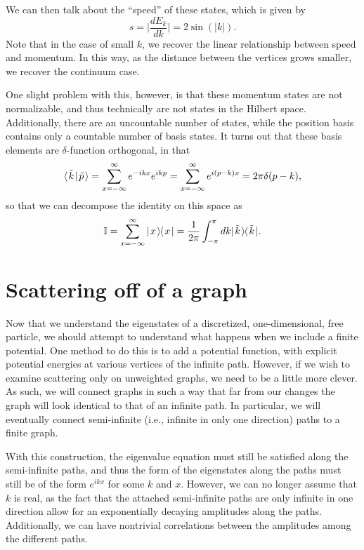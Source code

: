 \documentclass[../thesis-main/thesis-main]{subfiles}
\begin{document}
  We can then talk about the ``speed'' of these states, which is given by
\begin{equation}
  s = \Big| \frac{d E_k}{d k} \Big| = 2 \sin (|k|).
\end{equation}
Note that in the case of small $k$, we recover the linear relationship between speed and momentum.  In this way, as the distance between the vertices grows smaller, we recover the continuum case.  

One slight problem with this, however, is that these momentum states are not normalizable, and thus technically are not states in the Hilbert space.  Additionally, there are an uncountable number of states, while the position basis contains only a countable number of basis states.  It turns out that these basis elements are $\delta$-function orthogonal, in that
\begin{equation}
  \langle\mspace{2mu} \tilde{k} \mspace{2mu} | \mspace{2mu} \tilde{p}\mspace{2mu} \rangle = \sum_{x=-\infty}^\infty e^{- i k x} e^{i k p} = \sum_{x=-\infty}^\infty e^{i (p-k) x} = 2\pi \delta(p-k),
\end{equation}
so that we can decompose the identity on this space as 
\begin{equation}
\mathbb{I} = \sum_{x=-\infty}^\infty |\mspace{2mu} x \mspace{2mu} \rangle\mspace{-2mu}\langle\mspace{2mu} x \mspace{2mu} | = \frac{1}{2\pi} \int_{-\pi}^\pi dk |\mspace{2mu} \tilde{k} \mspace{2mu} \rangle\mspace{-2mu}\langle\mspace{2mu} \tilde{k} \mspace{2mu} |.
\end{equation}


\section{Scattering off of a graph}

Now that we understand the eigenstates of a discretized, one-dimensional, free particle, we should attempt to understand what happens when we include a finite potential.  One method to do this is to add a potential function, with explicit potential energies at various vertices of the infinite path.   However, if we wish to examine scattering only on unweighted graphs, we need to be a little more clever.  As such, we will connect graphs in such a way that far from our changes the graph will look identical to that of an infinite path.  In particular, we will eventually connect semi-infinite (i.e., infinite in only one direction) paths to a finite graph.

With this construction, the eigenvalue equation must still be satisfied along the semi-infinite paths, and thus the form of the eigenstates along the paths must still be of the form $e^{i k x}$ for some $k$ and $x$.  However, we can no longer assume that $k$ is real, as the fact that the attached semi-infinite paths are only infinite in one direction allow for an exponentially decaying amplitudes along the paths.  Additionally, we can have nontrivial correlations between the amplitudes among the different paths.
\end{document}
